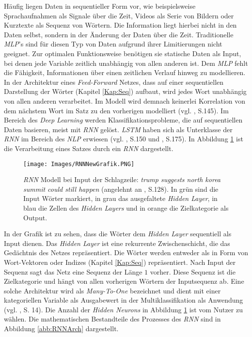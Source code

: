 \documentclass[a4paper,11pt]{article}
\begin{document}
Häufig liegen Daten in sequentieller Form vor, wie beispielsweise Sprachaufnahmen als Signale über die Zeit, Videos als Serie von Bildern oder Kurztexte als Sequenz von Wörtern. Die Information liegt hierbei nicht in den Daten selbst, sondern in der Änderung der Daten über die Zeit. Traditionelle \textit{MLP}'s sind für diesen Typ von Daten aufgrund ihrer Limitierungen nicht geeignet. Zur optimalen Funktionsweise benötigen sie statische Daten als Input, bei denen jede Variable zeitlich unabhängig von allen anderen ist. Dem \textit{MLP} fehlt die Fähigkeit, Informationen über einen zeitlichen Verlauf hinweg zu modellieren. In der Architektur eines \textit{Feed-Forward} Netzes, dass auf einer sequentiellen Darstellung der Wörter (Kapitel \ref{Kap:Seq}) aufbaut, wird jedes Wort unabhängig von allen anderen verarbeitet. Im Modell wird demnach keinerlei Korrelation von dem nächstem Wort im Satz zu den vorherigen modelliert (vgl. \cite{deepEssentials}, S.145). Im Bereich des \textit{Deep Learning} werden Klassifikationsprobleme, die auf sequentiellen Daten basieren, meist mit \textit{RNN} gelöst. \textit{LSTM} haben sich als Unterklasse der \textit{RNN} im Bereich des \textit{NLP} erwiesen (vgl. \cite{deepEssentials}, S.150 und \cite{keras}, S.175). In Abbildung \ref{abb:RNNExample} ist die Verarbeitung eines Satzes durch ein \textit{RNN} dargestellt.

\begin{figure}[!ht]
\begin{center}
\texttt{[image: Images/RNNNewGrafik.PNG]}
\caption{\textit{RNN} Modell bei Input der Schlagzeile: \textit{trump suggests north korea summit could still happen} (angelehnt an \cite{deepNLP}, S.128). In grün sind die Input Wörter markiert, in grau das ausgefaltete \textit{Hidden Layer}, in blau die Zellen des \textit{Hidden Layers} und in orange die Zielkategorie als Output.}
\label{abb:RNNExample}
\end{center}
\end{figure}

In der Grafik ist zu sehen, dass die Wörter dem \textit{Hidden Layer} sequentiell als Input dienen. Das \textit{Hidden Layer} ist eine rekurrente Zwischenschicht, die das Gedächtnis des Netzes repräsentiert. Die Wörter werden entweder als in Form von Wort-Vektoren oder Indizes (Kapitel \ref{Kap:Seq}) repräsentiert. Nach Input der Sequenz sagt das Netz eine Sequenz der Länge $1$ vorher. Diese Sequenz ist die Zielkategorie und hängt von allen vorherigen Wörtern der Inputsequenz ab. 
Eine solche Architektur wird als \textit{Many-To-One}
bezeichnet und dient mit einer kategoriellen Variable als Ausgabewert in der Multiklassifikation als Anwendung (vgl. \cite{deepEssentials}, S. 14). Die Anzahl der \textit{Hidden Neurons} in Abbildung \ref{abb:RNNExample} ist vom Nutzer zu wählen. Die mathematischen Bestandteile des Prozesses des \textit{RNN} sind in Abbildung \ref{abb:RNNArch} dargestellt.
\end{document}
